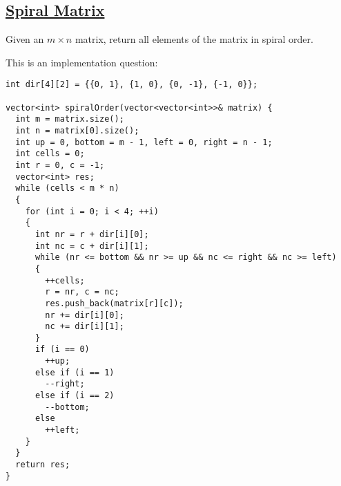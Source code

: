 \documentclass{book}
\begin{document}
	\subsection{\href{https://leetcode.com/problems/spiral-matrix/}{Spiral Matrix}}
	Given an $m \times n$ matrix, return all elements of the matrix in spiral order.
	\par This is an implementation question:
	\begin{lstlisting}
int dir[4][2] = {{0, 1}, {1, 0}, {0, -1}, {-1, 0}};

vector<int> spiralOrder(vector<vector<int>>& matrix) {
  int m = matrix.size();
  int n = matrix[0].size();
  int up = 0, bottom = m - 1, left = 0, right = n - 1;
  int cells = 0;
  int r = 0, c = -1;
  vector<int> res;
  while (cells < m * n)
  {
    for (int i = 0; i < 4; ++i)
    {
      int nr = r + dir[i][0];
      int nc = c + dir[i][1];
      while (nr <= bottom && nr >= up && nc <= right && nc >= left)
      {
        ++cells;
        r = nr, c = nc;
        res.push_back(matrix[r][c]);
        nr += dir[i][0];
        nc += dir[i][1];
      }
      if (i == 0)
        ++up;
      else if (i == 1)
        --right;
      else if (i == 2)
        --bottom;
      else
        ++left;
    }
  }
  return res;
}
	\end{lstlisting}
\end{document}
